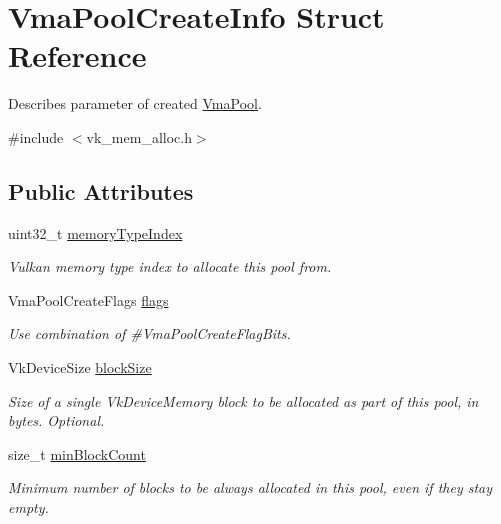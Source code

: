 \hypertarget{structVmaPoolCreateInfo}{}\section{Vma\+Pool\+Create\+Info Struct Reference}
\label{structVmaPoolCreateInfo}


Describes parameter of created \hyperlink{structVmaPool}{Vma\+Pool}.  




{\ttfamily \#include $<$vk\+\_\+mem\+\_\+alloc.\+h$>$}

\subsection*{Public Attributes}
\begin{DoxyCompactItemize}
\item 
\mbox{\label{structVmaPoolCreateInfo_a596fa76b685d3f1f688f84a709a5b319}} 
uint32\+\_\+t \hyperlink{structVmaPoolCreateInfo_a596fa76b685d3f1f688f84a709a5b319}{memory\+Type\+Index}
\begin{DoxyCompactList}\small\item\em Vulkan memory type index to allocate this pool from. \end{DoxyCompactList}\item 
\mbox{\label{structVmaPoolCreateInfo_a8405139f63d078340ae74513a59f5446}} 
Vma\+Pool\+Create\+Flags \hyperlink{structVmaPoolCreateInfo_a8405139f63d078340ae74513a59f5446}{flags}
\begin{DoxyCompactList}\small\item\em Use combination of \#\+Vma\+Pool\+Create\+Flag\+Bits. \end{DoxyCompactList}\item 
Vk\+Device\+Size \hyperlink{structVmaPoolCreateInfo_aa4265160536cdb9be821b7686c16c676}{block\+Size}
\begin{DoxyCompactList}\small\item\em Size of a single {\ttfamily Vk\+Device\+Memory} block to be allocated as part of this pool, in bytes. Optional. \end{DoxyCompactList}\item 
size\+\_\+t \hyperlink{structVmaPoolCreateInfo_ad8006fb803185c0a699d30f3e9a865ae}{min\+Block\+Count}
\begin{DoxyCompactList}\small\item\em Minimum number of blocks to be always allocated in this pool, even if they stay empty. \end{DoxyCompactList}\item 

\end{DoxyCompactItemize}
